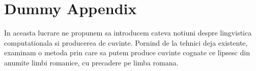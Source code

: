 \chapter{Dummy Appendix}
In aceasta lucrare ne propunem sa introducem cateva notiuni despre lingvistica computationala si 
producerea de cuvinte. Pornind de la tehnici deja existente, examinam o metoda prin care sa putem 
produce cuvinte cognate ce lipsesc din anumite limbi romanice, cu precadere pe limba romana.


